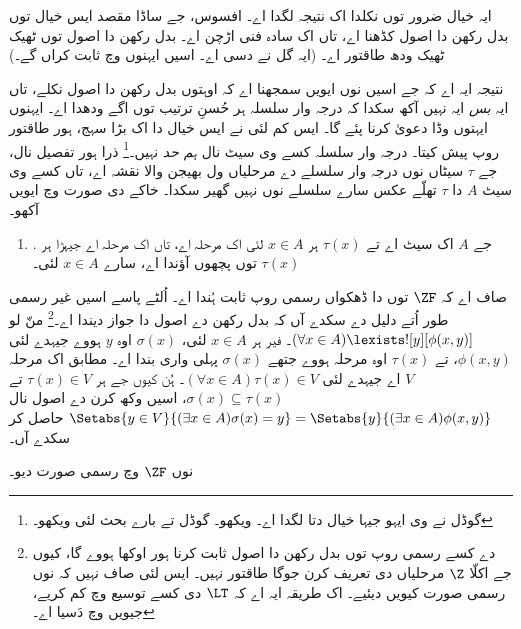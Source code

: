 \documentclass[../../../include/open-logic-section]{subfiles}
\begin{document}
ایہ خیال ضرور \stagesinex توں نکلدا اک نتیجہ لگدا اے۔ افسوس، جے ساڈا مقصد ایس خیال توں بدل رکھن دا اصول کڈھنا اے، تاں اک سادہ فنی اڑچن اے۔ بدل رکھن دا اصول  توں ٹھیک ٹھیک ودھ طاقتور اے۔ (ایہ گل \citet[\S13.2]{Potter2004} نے دسی اے۔ اسیں ایہنوں  وچ ثابت کراں گے۔)

نتیجہ ایہ اے کہ جے اسیں \stagesinex{} نوں ایویں سمجھنا اے کہ اوہتوں بدل رکھن دا اصول نکلے، تاں ایہ \emph{بس} ایہ نہیں آکھ سکدا کہ درجہ وار سلسلہ ہر حُسنِ ترتیب توں اگے ودھدا اے۔ ایہنوں ایہتوں وڈا دعویٰ کرنا پئے گا۔ ایس کم لئی \cite{Shoenfield:AST} نے ایس خیال دا اک بڑا سہج، ہور طاقتور روپ پیش کیتا۔ درجہ وار سلسلہ کسے وی سیٹ نال \emph{ہم حد} نہیں۔\footnote{گوڈل نے وی ایہو جیہا خیال دتا لگدا اے۔ \citet[p.~223]{Potter2004} ویکھو۔ گوڈل تے \citeauthor{Shoenfield:AST} بارے بحث لئی \citet[90--5]{Incurvati2020} ویکھو۔} ذرا ہور تفصیل نال، جے $\tau$ سیٹاں نوں درجہ وار سلسلے دے مرحلیاں ول بھیجن والا نقشہ اے، تاں کسے وی سیٹ $A$ دا $\tau$ تھلّے عکس سارے سلسلے نوں نہیں گھیر سکدا۔ خاکے دی صورت وچ ایویں آکھو۔
\begin{enumerate}
	\item[] \stagescofin. جے $A$ اک سیٹ اے تے $\tau(x)$ ہر $x \in A$ لئی اک مرحلہ اے، تاں اک مرحلہ اے جیہڑا ہر $\tau(x)$ توں پچھوں آؤندا اے، سارے $x \in A$ لئی۔
\end{enumerate}
صاف اے کہ $\ZF$ توں \stagescofin دا ڈھکواں رسمی روپ ثابت ہُندا اے۔ اُلٹے پاسے اسیں غیر رسمی طور اُتے دلیل دے سکدے آں کہ \stagescofin{} بدل رکھن دے اصول دا جواز دیندا اے۔\footnote{\stagescofin دے کسے رسمی روپ توں بدل رکھن دا اصول ثابت کرنا ہور اوکھا ہووے گا، کیوں جے اکلّا $\Z$ مرحلیاں دی تعریف کرن جوگا طاقتور نہیں۔ ایس لئی صاف نہیں کہ \stagescofin نوں رسمی صورت کیویں دیئیے۔ اک طریقہ ایہ اے کہ $\LT$ دی کسے توسیع وچ کم کریے، جیویں  وچ دَسیا اے۔} منّ لو $(\forall x \in A)\lexists![y][\phi(x,y)]$۔ فیر ہر $x \in A$ لئی، $\sigma(x)$ اوہ $y$ ہووے جیہدے لئی $\phi(x,y)$، تے $\tau(x)$ اوہ مرحلہ ہووے جتھے $\sigma(x)$ پہلی واری بندا اے۔ \stagescofin مطابق اک مرحلہ $V$ اے جیہدے لئی $(\forall x \in A)\tau(x)\in V$۔ ہُن کیوں جے ہر $\tau(x) \in V$ تے $\sigma(x) \subseteq \tau(x)$، اسیں وکھ کرن دے اصول نال $ \Setabs{y
\in V}{(\exists x \in A)\sigma(x) = y} = \Setabs{y}{(\exists x \in
A)\phi(x,y)}$ حاصل کر سکدے آں۔

\begin{prob}
	\stagescofin{} نوں $\ZF$ وچ رسمی صورت دیو۔
\end{prob}
\end{document}
